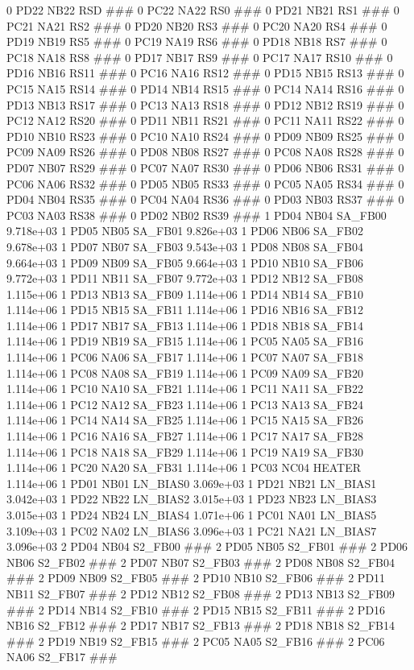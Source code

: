 0 PD22 NB22 RSD ### 
0 PC22 NA22 RS0 ### 
0 PD21 NB21 RS1 ### 
0 PC21 NA21 RS2 ### 
0 PD20 NB20 RS3 ### 
0 PC20 NA20 RS4 ### 
0 PD19 NB19 RS5 ### 
0 PC19 NA19 RS6 ### 
0 PD18 NB18 RS7 ### 
0 PC18 NA18 RS8 ### 
0 PD17 NB17 RS9 ### 
0 PC17 NA17 RS10 ### 
0 PD16 NB16 RS11 ### 
0 PC16 NA16 RS12 ### 
0 PD15 NB15 RS13 ### 
0 PC15 NA15 RS14 ### 
0 PD14 NB14 RS15 ### 
0 PC14 NA14 RS16 ### 
0 PD13 NB13 RS17 ### 
0 PC13 NA13 RS18 ### 
0 PD12 NB12 RS19 ### 
0 PC12 NA12 RS20 ### 
0 PD11 NB11 RS21 ### 
0 PC11 NA11 RS22 ### 
0 PD10 NB10 RS23 ### 
0 PC10 NA10 RS24 ### 
0 PD09 NB09 RS25 ### 
0 PC09 NA09 RS26 ### 
0 PD08 NB08 RS27 ### 
0 PC08 NA08 RS28 ### 
0 PD07 NB07 RS29 ### 
0 PC07 NA07 RS30 ### 
0 PD06 NB06 RS31 ### 
0 PC06 NA06 RS32 ### 
0 PD05 NB05 RS33 ### 
0 PC05 NA05 RS34 ### 
0 PD04 NB04 RS35 ### 
0 PC04 NA04 RS36 ### 
0 PD03 NB03 RS37 ### 
0 PC03 NA03 RS38 ### 
0 PD02 NB02 RS39 ### 
1 PD04 NB04 SA_FB00 9.718e+03 
1 PD05 NB05 SA_FB01 9.826e+03 
1 PD06 NB06 SA_FB02 9.678e+03 
1 PD07 NB07 SA_FB03 9.543e+03 
1 PD08 NB08 SA_FB04 9.664e+03 
1 PD09 NB09 SA_FB05 9.664e+03 
1 PD10 NB10 SA_FB06 9.772e+03 
1 PD11 NB11 SA_FB07 9.772e+03 
1 PD12 NB12 SA_FB08 1.115e+06 
1 PD13 NB13 SA_FB09 1.114e+06 
1 PD14 NB14 SA_FB10 1.114e+06 
1 PD15 NB15 SA_FB11 1.114e+06 
1 PD16 NB16 SA_FB12 1.114e+06 
1 PD17 NB17 SA_FB13 1.114e+06 
1 PD18 NB18 SA_FB14 1.114e+06 
1 PD19 NB19 SA_FB15 1.114e+06 
1 PC05 NA05 SA_FB16 1.114e+06 
1 PC06 NA06 SA_FB17 1.114e+06 
1 PC07 NA07 SA_FB18 1.114e+06 
1 PC08 NA08 SA_FB19 1.114e+06 
1 PC09 NA09 SA_FB20 1.114e+06 
1 PC10 NA10 SA_FB21 1.114e+06 
1 PC11 NA11 SA_FB22 1.114e+06 
1 PC12 NA12 SA_FB23 1.114e+06 
1 PC13 NA13 SA_FB24 1.114e+06 
1 PC14 NA14 SA_FB25 1.114e+06 
1 PC15 NA15 SA_FB26 1.114e+06 
1 PC16 NA16 SA_FB27 1.114e+06 
1 PC17 NA17 SA_FB28 1.114e+06 
1 PC18 NA18 SA_FB29 1.114e+06 
1 PC19 NA19 SA_FB30 1.114e+06 
1 PC20 NA20 SA_FB31 1.114e+06 
1 PC03 NC04 HEATER 1.114e+06 
1 PD01 NB01 LN_BIAS0 3.069e+03 
1 PD21 NB21 LN_BIAS1 3.042e+03 
1 PD22 NB22 LN_BIAS2 3.015e+03 
1 PD23 NB23 LN_BIAS3 3.015e+03 
1 PD24 NB24 LN_BIAS4 1.071e+06 
1 PC01 NA01 LN_BIAS5 3.109e+03 
1 PC02 NA02 LN_BIAS6 3.096e+03 
1 PC21 NA21 LN_BIAS7 3.096e+03 
2 PD04 NB04 S2_FB00 ### 
2 PD05 NB05 S2_FB01 ### 
2 PD06 NB06 S2_FB02 ### 
2 PD07 NB07 S2_FB03 ### 
2 PD08 NB08 S2_FB04 ### 
2 PD09 NB09 S2_FB05 ### 
2 PD10 NB10 S2_FB06 ### 
2 PD11 NB11 S2_FB07 ### 
2 PD12 NB12 S2_FB08 ### 
2 PD13 NB13 S2_FB09 ### 
2 PD14 NB14 S2_FB10 ### 
2 PD15 NB15 S2_FB11 ### 
2 PD16 NB16 S2_FB12 ### 
2 PD17 NB17 S2_FB13 ### 
2 PD18 NB18 S2_FB14 ### 
2 PD19 NB19 S2_FB15 ### 
2 PC05 NA05 S2_FB16 ### 
2 PC06 NA06 S2_FB17 ### 
